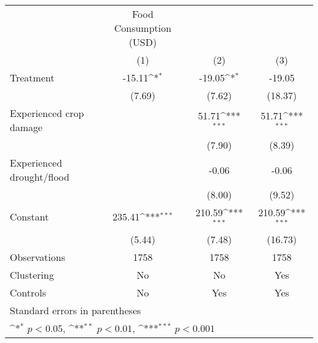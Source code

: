 {
\def\sym#1{\ifmmode^{#1}\else\(^{#1}\)\fi}
\begin{tabular}{l*{3}{c}}
\hline\hline
                    &Food Consumption (USD)                                           \\
                    &\multicolumn{1}{c}{(1)}         &\multicolumn{1}{c}{(2)}         &\multicolumn{1}{c}{(3)}         \\
\hline
Treatment           &      -15.11\sym{*}  &      -19.05\sym{*}  &      -19.05         \\
                    &      (7.69)         &      (7.62)         &     (18.37)         \\
[1em]
Experienced crop damage&                     &       51.71\sym{***}&       51.71\sym{***}\\
                    &                     &      (7.90)         &      (8.39)         \\
[1em]
Experienced drought/flood&                     &       -0.06         &       -0.06         \\
                    &                     &      (8.00)         &      (9.52)         \\
[1em]
Constant            &      235.41\sym{***}&      210.59\sym{***}&      210.59\sym{***}\\
                    &      (5.44)         &      (7.48)         &     (16.73)         \\
\hline
Observations        &        1758         &        1758         &        1758         \\
Clustering          &          No         &          No         &         Yes         \\
Controls            &          No         &         Yes         &         Yes         \\
\hline\hline
\multicolumn{4}{l}{\footnotesize Standard errors in parentheses}\\
\multicolumn{4}{l}{\footnotesize \sym{*} \(p<0.05\), \sym{**} \(p<0.01\), \sym{***} \(p<0.001\)}\\
\end{tabular}
}
